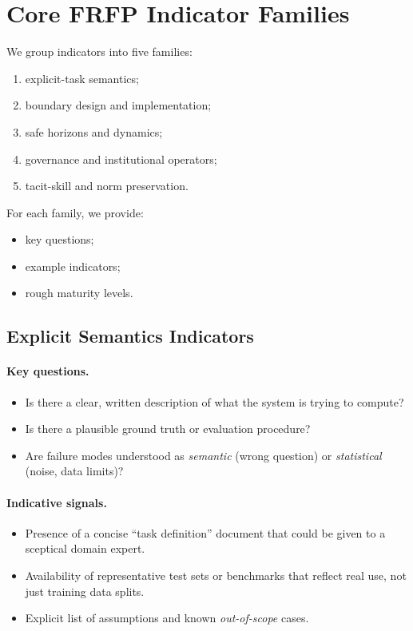 \section{Core FRFP Indicator Families}

We group indicators into five families:

\begin{enumerate}
  \item explicit-task semantics;
  \item boundary design and implementation;
  \item safe horizons and dynamics;
  \item governance and institutional operators;
  \item tacit-skill and norm preservation.
\end{enumerate}

For each family, we provide:

\begin{itemize}
  \item key questions;
  \item example indicators;
  \item rough maturity levels.
\end{itemize}

\subsection{Explicit Semantics Indicators}

\paragraph{Key questions.}

\begin{itemize}
  \item Is there a clear, written description of what the system is
        trying to compute?
  \item Is there a plausible ground truth or evaluation procedure?
  \item Are failure modes understood as \emph{semantic} (wrong
        question) or \emph{statistical} (noise, data limits)?
\end{itemize}

\paragraph{Indicative signals.}

\begin{itemize}
  \item Presence of a concise ``task definition'' document that could be
        given to a sceptical domain expert.
  \item Availability of representative test sets or benchmarks that
        reflect real use, not just training data splits.
  \item Explicit list of assumptions and known \emph{out-of-scope}
        cases.
\end{itemize}

